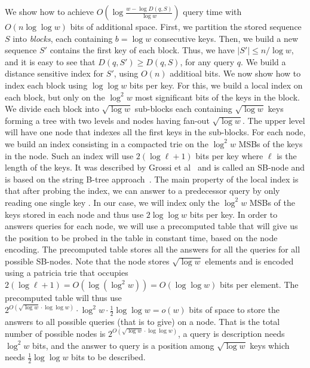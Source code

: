 \documentclass[a4paper,11pt]{article}
\newcommand{\?}{\mskip1.5mu}
\begin{document}
We show how to achieve 
$O(\log\frac{w - \log D(q, S)}{\log w})$ query 
time with $O(n\log\log w)$ bits of additional space. 
First, we partition the stored sequence $S$ into \emph{blocks},  
each containing $b = \log w$ consecutive keys. Then, we build 
a new sequence $S'$  contains the first key of each block.
Thus, we have $|S'| \leq n/\log w$, and it is easy to see that 
$D(q, S')\geq D(q, S)$, for any query $q$. 
We build a distance sensitive index for $S'$,
using $O(n)$ additioal bits. We now show how to index each block 
using $\log\log w$ bits per key. For this, we 
build a local index on each block, but only on the $\log^2 w$ most 
significant bits of the keys in the block. We divide each block into $\sqrt{\log w}$ sub-blocks each containing $\sqrt{\log w}$ keys forming a tree with two levels and nodes having fan-out $\sqrt{\log w}$. The upper level will have one node that indexes all the first keys in the sub-blocks. For each node, we build an index consisting in a compacted trie on the $\log^2 w$ MSBs of the keys in the node. Such an index will use $2(\log\ell+1)$ bits per key where $\ell$ is the length of the keys. It was described by Grossi et al~\cite{GRR09} and is called an SB-node and is based on the string B-tree approach~\cite{FG99}. The main property of the local index is that after probing the index, we can answer to a predecessor query by only reading one single key . In our case, we will index only the $\log^2 w$ MSBs of the keys stored in each node and thus use $2\log\log w$ bits per key. In order to answers queries for each node, we will use a precomputed table that will give us the position to be probed in the table in constant time, based on the node encoding. The precomputed table stores all the answers for all the queries for all possible SB-nodes. Note that the node stores $\sqrt{\log w}$ elements and is encoded using a patricia trie that occupies $2(\log\ell+1)=O(\log(\log^2w))=O(\log\log w)$ bits per element. The precomputed table will thus use $2^{O(\sqrt{\log w}\cdot \log\log w)}\cdot\log^2w\cdot\frac{1}{2}\log\log w=o(w)$ bits of space to store the answers to all possible queries (that is to give) on a node. That is the total number of possible nodes is  $2^{O(\sqrt{\log w}\cdot \log\log w)}$, a query is description needs $\log^2w$ bits,  and the answer to query is a position among $\sqrt{\log w}$ keys which needs $\frac{1}{2}\log\log w$ bits to be described.
\end{document}
